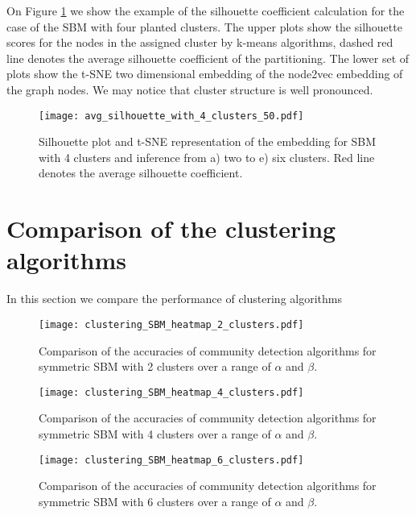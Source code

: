 On Figure \ref{fig:silhouette_example} we show the example of the silhouette coefficient calculation for the case of the SBM with four planted clusters. The upper plots show the silhouette scores for the nodes in the assigned cluster by k-means algorithms, dashed red line denotes the average silhouette coefficient of the partitioning. The lower set of plots show the t-SNE two dimensional embedding of the node2vec embedding of the graph nodes. We may notice that cluster structure is well pronounced. 
 \begin{figure}[ht]
 \centering
    \texttt{[image: avg\_silhouette\_with\_4\_clusters\_50.pdf]}
   \caption{Silhouette plot and t-SNE representation of the embedding for SBM with 4 clusters and inference from a) two to e) six clusters. Red line denotes the average silhouette coefficient.}
   \label{fig:silhouette_example}
 \end{figure}


\section{Comparison of the clustering algorithms}
In this section we compare the performance of clustering algorithms
 \begin{figure}[ht]
 \centering
    \texttt{[image: clustering\_SBM\_heatmap\_2\_clusters.pdf]}
   \caption{Comparison of the accuracies of community detection algorithms for symmetric SBM with 2 clusters over a range of $\alpha$ and $\beta$.}
   \label{fig:comparison_clustering_2clusters}
 \end{figure}
 
 \begin{figure}[ht]
 \centering
    \texttt{[image: clustering\_SBM\_heatmap\_4\_clusters.pdf]}
   \caption{Comparison of the accuracies of community detection algorithms for symmetric SBM with 4 clusters over a range of $\alpha$ and $\beta$.}
   \label{fig:comparison_clustering_4clusters}
 \end{figure}
 
  \begin{figure}[ht]
 \centering
    \texttt{[image: clustering\_SBM\_heatmap\_6\_clusters.pdf]}
   \caption{Comparison of the accuracies of community detection algorithms for symmetric SBM with 6 clusters over a range of $\alpha$ and $\beta$.}
   \label{fig:comparison_clustering_6clusters}
 \end{figure}




